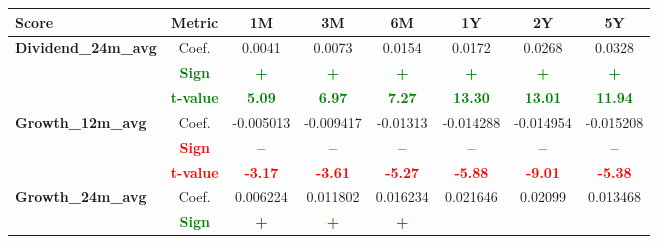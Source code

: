 \documentclass[11pt,english,a4paper,hidelinks]{book}
\begin{document}
\begin{table}[H]
    \centering
    \begin{tabular}{lccccccc}
        \toprule
        \textbf{Score} & \textbf{Metric} & \textbf{1M} & \textbf{3M} & \textbf{6M} & \textbf{1Y} & \textbf{2Y} & \textbf{5Y} \\
        \midrule
        \multirow{3}{*}{\textbf{Dividend\_24m\_avg}} 
        & Coef.   & 0.0041   & 0.0073  & 0.0154  & 0.0172  & 0.0268  & 0.0328  \\
        & \textbf{\textcolor{green}{Sign}}
                     & \textbf{\textcolor{green}{+}}
                     & \textbf{\textcolor{green}{+}}
                     & \textbf{\textcolor{green}{+}}
                     & \textbf{\textcolor{green}{+}}
                     & \textbf{\textcolor{green}{+}}
                     & \textbf{\textcolor{green}{+}} \\
        & \textbf{\textcolor{green}{t-value}}
                     & \textbf{\textcolor{green}{5.09}}
                     & \textbf{\textcolor{green}{6.97}}
                     & \textbf{\textcolor{green}{7.27}}
                     & \textbf{\textcolor{green}{13.30}}
                     & \textbf{\textcolor{green}{13.01}}
                     & \textbf{\textcolor{green}{11.94}} \\
        \midrule
        \multirow{3}{*}{\textbf{Growth\_12m\_avg}}
            & Coef.   & -0.005013 & -0.009417 & -0.01313  & -0.014288 & -0.014954 & -0.015208 \\
            & \textbf{\textcolor{red}{Sign}}    & \textbf{\textcolor{red}{–}}         & \textbf{\textcolor{red}{–}}         & \textbf{\textcolor{red}{–}}         & \textbf{\textcolor{red}{–}}         & \textbf{\textcolor{red}{–}}         & \textbf{\textcolor{red}{–}}         \\
            & \textbf{\textcolor{red}{t-value}} & \textbf{\textcolor{red}{-3.17}}     & \textbf{\textcolor{red}{-3.61}}     & \textbf{\textcolor{red}{-5.27}}     & \textbf{\textcolor{red}{-5.88}}     & \textbf{\textcolor{red}{-9.01}}     & \textbf{\textcolor{red}{-5.38}}     \\
        \midrule
        \multirow{3}{*}{\textbf{Growth\_24m\_avg}}
            & Coef.   & 0.006224  & 0.011802  & 0.016234  & 0.021646  & 0.02099   & 0.013468  \\
            & \textbf{\textcolor{green}{Sign}}
                     & \textbf{\textcolor{green}{+}}
                     & \textbf{\textcolor{green}{+}}
                     & \textbf{\textcolor{green}{+}}

\end{tabular}
\end{table}
\end{document}
